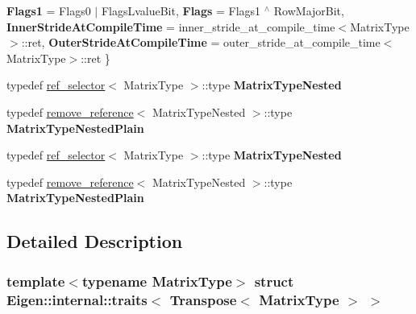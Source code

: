 \begin{DoxyCompactItemize}
{\bfseries Flags1} = Flags0 $\vert$ Flags\+Lvalue\+Bit, 
{\bfseries Flags} = Flags1 $^\wedge$ Row\+Major\+Bit, 
\newline
{\bfseries Inner\+Stride\+At\+Compile\+Time} = inner\+\_\+stride\+\_\+at\+\_\+compile\+\_\+time$<$Matrix\+Type$>$\+:\+:ret, 
{\bfseries Outer\+Stride\+At\+Compile\+Time} = outer\+\_\+stride\+\_\+at\+\_\+compile\+\_\+time$<$Matrix\+Type$>$\+:\+:ret
 \}
\item 
\mbox{\label{struct_eigen_1_1internal_1_1traits_3_01_transpose_3_01_matrix_type_01_4_01_4_af03354ff50cf117fe23a0caac756e3ee}} 
typedef \hyperlink{struct_eigen_1_1internal_1_1ref__selector}{ref\+\_\+selector}$<$ Matrix\+Type $>$\+::type {\bfseries Matrix\+Type\+Nested}
\item 
\mbox{\label{struct_eigen_1_1internal_1_1traits_3_01_transpose_3_01_matrix_type_01_4_01_4_ae5b6205259511832d2015de8dcf8e40b}} 
typedef \hyperlink{struct_eigen_1_1internal_1_1remove__reference}{remove\+\_\+reference}$<$ Matrix\+Type\+Nested $>$\+::type {\bfseries Matrix\+Type\+Nested\+Plain}
\item 
\mbox{\label{struct_eigen_1_1internal_1_1traits_3_01_transpose_3_01_matrix_type_01_4_01_4_af03354ff50cf117fe23a0caac756e3ee}} 
typedef \hyperlink{struct_eigen_1_1internal_1_1ref__selector}{ref\+\_\+selector}$<$ Matrix\+Type $>$\+::type {\bfseries Matrix\+Type\+Nested}
\item 
\mbox{\label{struct_eigen_1_1internal_1_1traits_3_01_transpose_3_01_matrix_type_01_4_01_4_ae5b6205259511832d2015de8dcf8e40b}} 
typedef \hyperlink{struct_eigen_1_1internal_1_1remove__reference}{remove\+\_\+reference}$<$ Matrix\+Type\+Nested $>$\+::type {\bfseries Matrix\+Type\+Nested\+Plain}
\end{DoxyCompactItemize}


\subsection{Detailed Description}
\subsubsection*{template$<$typename Matrix\+Type$>$\newline
struct Eigen\+::internal\+::traits$<$ Transpose$<$ Matrix\+Type $>$ $>$}



